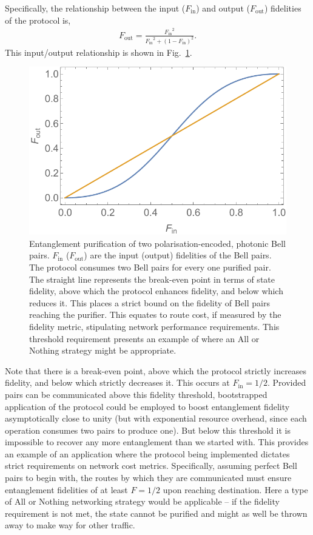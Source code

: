 \documentclass[aps,rmp,twocolumn,amsmath,amssymb,nofootinbib,superscriptaddress,longbibliography,floatfix]{revtex4-1}
\begin{document}
Specifically, the relationship between the input ($F_\mathrm{in}$) and output ($F_\mathrm{out}$) fidelities of the protocol is,
\begin{align}
F_\mathrm{out} = \frac{{F_\mathrm{in}}^2}{{F_\mathrm{in}}^2 + (1-F_\mathrm{in})^2}.
\end{align}
This input/output relationship is shown in Fig.~\ref{fig:ent_purif}.

\begin{figure}[!htb]
\includegraphics[width=\columnwidth]{ent_purif}
\caption{Entanglement purification of two polarisation-encoded, photonic Bell pairs. $F_\mathrm{in}$ ($F_\mathrm{out}$) are the input (output) fidelities of the Bell pairs. The protocol consumes two Bell pairs for every one purified pair. The straight line represents the break-even point in terms of state fidelity, above which the protocol enhances fidelity, and below which reduces it. This places a strict bound on the fidelity of Bell pairs reaching the purifier. This equates to route cost, if measured by the fidelity metric, stipulating network performance requirements. This threshold requirement presents an example of where an {\sc All or Nothing} strategy might be appropriate.} \label{fig:ent_purif}
\end{figure}

Note that there is a break-even point, above which the protocol strictly increases fidelity, and below which strictly decreases it. This occurs at \mbox{$F_\mathrm{in}=1/2$}. Provided pairs can be communicated above this fidelity threshold, bootstrapped application of the protocol could be employed to boost entanglement fidelity asymptotically close to unity (but with exponential resource overhead, since each operation consumes two pairs to produce one). But below this threshold it is impossible to recover any more entanglement than we started with. This provides an example of an application where the protocol being implemented dictates strict requirements on network cost metrics. Specifically, assuming perfect Bell pairs to begin with, the routes by which they are communicated must ensure entanglement fidelities of at least \mbox{$F=1/2$} upon reaching destination. Here a type of {\sc All or Nothing} networking strategy would be applicable -- if the fidelity requirement is not met, the state cannot be purified and might as well be thrown away to make way for other traffic.
\end{document}
